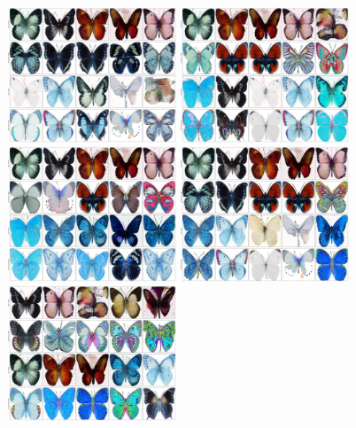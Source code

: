 \begin{figure}[!ht]
    \label{fig:realworldexperiments-butterflies}
    \centering
    \includegraphics[width=0.45\textwidth]{../images/realworldexperiments/butterflies/examples/fp_grayscale_histogram.png}
    \includegraphics[width=0.45\textwidth]{../images/realworldexperiments/butterflies/examples/fp_hsv_histogram.png}
    \includegraphics[width=0.45\textwidth]{../images/realworldexperiments/butterflies/examples/fp_hue_histogram.png}
    \includegraphics[width=0.45\textwidth]{../images/realworldexperiments/butterflies/examples/fp_rgb_histogram.png}
    \includegraphics[width=0.45\textwidth]{../images/realworldexperiments/butterflies/examples/fp_saturation_histogram.png}

\end{figure}
